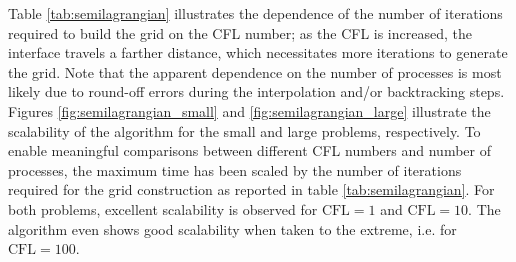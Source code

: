 Table \ref{tab:semilagrangian} illustrates the dependence of the number of iterations required to build the grid on the CFL number; as the CFL is increased, the interface travels a farther distance, which necessitates more iterations to generate the grid. Note that the apparent dependence on the number of processes is most likely due to round-off errors during the interpolation and/or backtracking steps. Figures \ref{fig:semilagrangian_small} and \ref{fig:semilagrangian_large} illustrate the scalability of the algorithm for the small and large problems, respectively. To enable meaningful comparisons between different CFL numbers and number of processes, the maximum time has been scaled by the number of iterations required for the grid construction as reported in table \ref{tab:semilagrangian}. For both problems, excellent scalability is observed for $\text{CFL} = 1$ and $\text{CFL} = 10$. The algorithm even shows good scalability when taken to the extreme, i.e. for $\text{CFL} = 100$.

